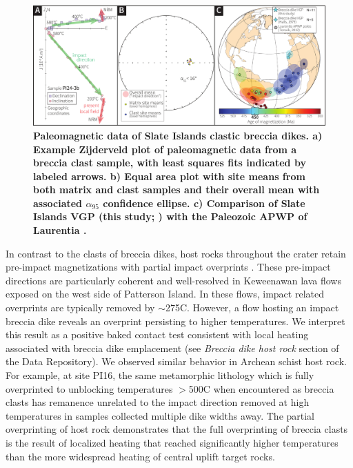 \documentclass[11pt,letterpaper]{article}
\begin{document}
\begin{figure}
\noindent\includegraphics[width=\textwidth]{figures/Pmag_data.pdf}
\caption{\textbf{\footnotesize{Paleomagnetic data of Slate Islands clastic breccia dikes. a) Example Zijderveld plot of paleomagnetic data from a breccia clast sample, with least squares fits indicated by labeled arrows. b) Equal area plot with site means from both matrix and clast samples and their overall mean with associated $\alpha_{95}$ confidence ellipse. c) Comparison of Slate Islands VGP (this study; \citet{Halls1979a}) with the Paleozoic APWP of Laurentia \citep{Torsvik2012a}.}}}
\label{fig:pmag}
\end{figure}

In contrast to the clasts of breccia dikes, host rocks throughout the crater retain pre-impact magnetizations with partial impact overprints \citep{Halls1979a}. These pre-impact directions are particularly coherent and well-resolved in Keweenawan lava flows exposed on the west side of Patterson Island. In these flows, impact related overprints are typically removed by $\sim$275\textdegree C. However, a flow hosting an impact breccia dike reveals an overprint persisting to higher temperatures. We interpret this result as a positive baked contact test consistent with local heating associated with breccia dike emplacement (see \textit{Breccia dike host rock} section of the Data Repository). We observed similar behavior in Archean schist host rock. For example, at site PI16, the same metamorphic lithology which is fully overprinted to unblocking temperatures $>$500\textdegree C when encountered as breccia clasts has remanence unrelated to the impact direction removed at high temperatures in samples collected multiple dike widths away. The partial overprinting of host rock demonstrates that the full overprinting of breccia clasts is the result of localized heating that reached significantly higher temperatures than the more widespread heating of central uplift target rocks.
\end{document}
